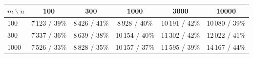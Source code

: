\begin{tabular}{lccccc}
\toprule
$m\backslash n$ & 100 & 300 & 1000 & 3000 & 10000 \\
\midrule
100 & 7\,123 / 39\% & 8\,426 / 41\% & 8\,928 / 40\% & 10\,191 / 42\% & 10\,080 / 39\% \\
300 & 7\,337 / 36\% & 8\,639 / 38\% & 10\,154 / 40\% & 11\,302 / 42\% & 12\,022 / 41\% \\
1000 & 7\,526 / 33\% & 8\,828 / 35\% & 10\,157 / 37\% & 11\,595 / 39\% & 14\,167 / 44\% \\
\bottomrule
\end{tabular}